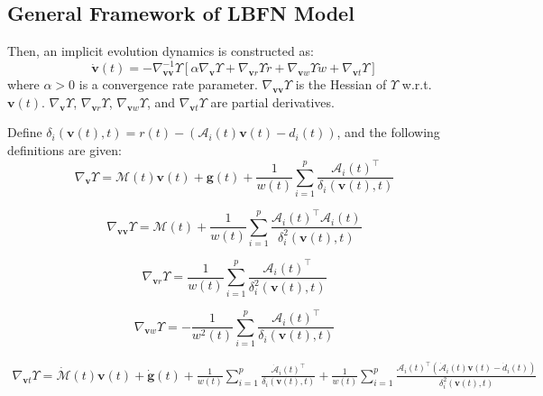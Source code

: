 \documentclass[fleqn,10pt]{wlscirep}
\begin{document}
\subsection{General Framework of LBFN Model}
Then, an implicit evolution dynamics is constructed as:
\begin{equation}
\dot{\bm{v}}(t) = -\nabla_{\bm{v}\bm{v}}^{-1} \Upsilon \left[ \alpha \nabla_{\bm{v}} \Upsilon + \nabla_{\bm{v} r} \Upsilon \dot{r} + \nabla_{\bm{v} w} \Upsilon \dot{w} + \nabla_{\bm{v} t} \Upsilon \right]
\label{eq:dynamics}
\end{equation}
where $\alpha > 0$ is a convergence rate parameter. $\nabla_{\bm{v} \bm{v}}\Upsilon$ is the Hessian of $\Upsilon$ w.r.t. $\bm{v}(t)$. $\nabla_{\bm{v}}\Upsilon$, $\nabla_{\bm{v} r}\Upsilon$, $\nabla_{\bm{v} w}\Upsilon$, and $\nabla_{\bm{v} t}\Upsilon$ are partial derivatives.

Define $\delta_i(\bm{v}(t),t)=r(t)-(\mathcal{A}_i(t)\bm{v}(t)-d_i(t))$, and the following definitions are given:
\begin{equation}
\nabla_{\bm{v}} \Upsilon = \mathcal{M}(t) \bm{v}(t) + \bm{g}(t) + \frac{1}{w(t)} \sum_{i=1}^{p} \frac{\mathcal{A}_i(t)^\top}{\delta_i(\bm{v}(t), t)}
\label{eq:grad_psi_u}
\end{equation}


\begin{equation}
\nabla_{\bm{v}\bm{v}} \Upsilon = \mathcal{M}(t) + \frac{1}{w(t)} \sum_{i=1}^{p} \frac{\mathcal{A}_i(t)^\top \mathcal{A}_i(t)}{\delta_i^2(\bm{v}(t), t)}
\label{eq:hessian_psi_uu}
\end{equation}

\begin{equation}
\nabla_{\bm{v} r} \Upsilon = \frac{1}{w(t)} \sum_{i=1}^{p} \frac{\mathcal{A}_i(t)^\top}{\delta_i^2(\bm{v}(t), t)}
\label{eq:grad_psi_ur}
\end{equation}

\begin{equation}
\nabla_{\bm{v} w} \Upsilon = -\frac{1}{w^2(t)} \sum_{i=1}^{p} \frac{\mathcal{A}_i(t)^\top}{\delta_i(\bm{v}(t), t)}
\label{eq:grad_psi_uw}
\end{equation}

\begin{equation}
\begin{aligned}
\nabla_{\bm{v} t} \Upsilon = \dot{\mathcal{M}}(t) \bm{v}(t) + \dot{\bm{g}}(t) + \frac{1}{w(t)} \sum_{i=1}^{p} \frac{\dot{\mathcal{A}}_i(t)^\top}{\delta_i(\bm{v}(t), t)}
+ \frac{1}{w(t)} \sum_{i=1}^{p} \frac{\mathcal{A}_i(t)^\top \left( \dot{\mathcal{A}}_i(t) \bm{v}(t) - \dot{d}_i(t) \right)}{\delta_i^2(\bm{v}(t), t)}
\end{aligned}
\label{eq:grad_psi_ut}
\end{equation}
\end{document}
